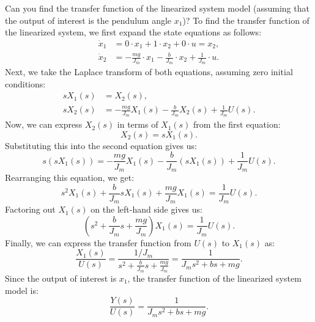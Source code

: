 \documentclass{ee122_notes}
\begin{document}
\begin{popquiz}
    Can you find the transfer function of the linearized system model (assuming that the output of interest is the pendulum angle $x_1$)?
    \popqsplit
    To find the transfer function of the linearized system, we first expand the state equations as follows:
\[
\begin{aligned}
\dot x_1 &= 0 \cdot x_1 + 1 \cdot x_2 + 0 \cdot u = x_2,\\
\dot x_2 &= -\frac{mg}{J_m} \cdot x_1 - \frac{b}{J_m} \cdot x_2 + \frac{1}{J_m} \cdot u.
\end{aligned}
\]
Next, we take the Laplace transform of both equations, assuming zero initial conditions:
\[
\begin{aligned}
sX_1(s) &= X_2(s),\\
sX_2(s) &= -\frac{mg}{J_m} X_1(s) - \frac{b}{J_m} X_2(s) + \frac{1}{J_m} U(s).
\end{aligned}
\]
Now, we can express $X_2(s)$ in terms of $X_1(s)$ from the first equation:
\[
X_2(s) = sX_1(s).
\]
Substituting this into the second equation gives us:
\[
s(sX_1(s)) = -\frac{mg}{J_m} X_1(s) - \frac{b}{J_m} (sX_1(s)) + \frac{1}{J_m} U(s).
\]
Rearranging this equation, we get:
\[
s^2 X_1(s) + \frac{b}{J_m} s X_1(s) + \frac{mg}{J_m} X_1(s) = \frac{1}{J_m} U(s).
\]
Factoring out $X_1(s)$ on the left-hand side gives us:
\[
\left(s^2 + \frac{b}{J_m} s + \frac{mg}{J_m}\right) X_1(s) = \frac{1}{J_m} U(s).
\]
Finally, we can express the transfer function from $U(s)$ to $X_1(s)$ as:
\[
\frac{X_1(s)}{U(s)} = \frac{1/J_m}{s^2 + \frac{b}{J_m} s + \frac{mg}{J_m}} = \frac{1}{J_m s^2 + b s + mg}.
\]
Since the output of interest is $x_1$, the transfer function of the linearized system model is:
\[
\frac{Y(s)}{U(s)} = \frac{1}{J_m s^2 + b s + mg}.
\]
\end{popquiz}
\end{document}
